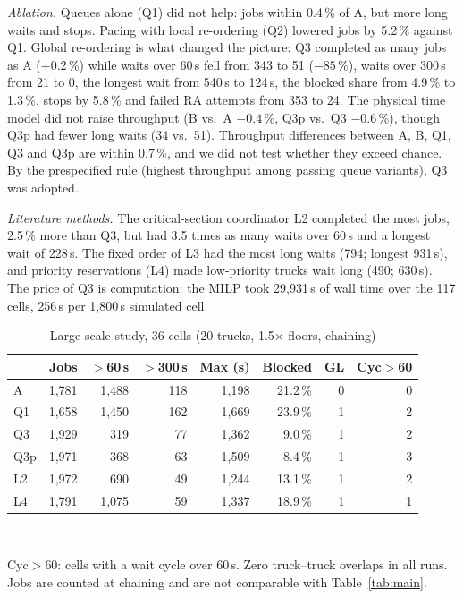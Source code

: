 \documentclass[conference]{IEEEtran}
\newcommand{\Qone}{Q1}
\newcommand{\Qtwo}{Q2}
\newcommand{\Qthree}{Q3}
\newcommand{\Qthreep}{Q3p}
\begin{document}
\emph{Ablation.} Queues alone (\Qone) did not help: jobs within 0.4\,\% of A, %
but more long waits and stops. Pacing with local re-ordering (\Qtwo) lowered jobs by
5.2\,\% against \Qone. %
Global re-ordering is what changed the picture: \Qthree{} completed as many jobs
as A (+0.2\,\%) %
while waits over 60\,s fell from 343 to 51 ($-85$\,\%), %
waits over 300\,s from 21 to 0, the longest wait from 540\,s to 124\,s, the
blocked share from 4.9\,\% to 1.3\,\%, stops by 5.8\,\% %
and failed RA attempts from 353 to 24. The physical time model did not raise
throughput (B vs.\ A $-0.4$\,\%, \Qthreep{} vs.\ \Qthree{} $-0.6$\,\%), though
\Qthreep{} had fewer long waits (34 vs.\ 51). Throughput differences between
A, B, \Qone, \Qthree{} and \Qthreep{} are within 0.7\,\%, and we did not test
whether they exceed chance. By the prespecified rule (highest throughput among
passing queue variants), \Qthree{} was adopted.

\emph{Literature methods.} The critical-section coordinator L2 completed the
most jobs, 2.5\,\% more than \Qthree, %
but had 3.5 times as many waits over 60\,s and a longest wait of 228\,s.
The fixed order of L3 had the most long waits (794; longest 931\,s), and
priority reservations (L4) made low-priority trucks wait long (490; 630\,s).
The price of \Qthree{} is computation: the MILP took 29{,}931\,s of wall time
over the 117 cells, 256\,s per 1{,}800\,s simulated cell.

\begin{table}[t]
\centering
\caption{Large-scale study, 36 cells (20 trucks, 1.5$\times$ floors, chaining)}
\label{tab:large}
\footnotesize
\setlength{\tabcolsep}{3pt}
\begin{tabular}{lrrrrrrr}
\toprule
 & Jobs & $>$60\,s & $>$300\,s & Max (s) & Blocked & GL & Cyc$>$60 \\
\midrule
A        & 1,781 & 1,488 & 118 & 1,198 & 21.2\,\% & 0 & 0 \\
\Qone    & 1,658 & 1,450 & 162 & 1,669 & 23.9\,\% & 1 & 2 \\
\Qthree  & 1,929 &   319 &  77 & 1,362 &  9.0\,\% & 1 & 2 \\
\Qthreep & 1,971 &   368 &  63 & 1,509 &  8.4\,\% & 1 & 3 \\
L2       & 1,972 &   690 &  49 & 1,244 & 13.1\,\% & 1 & 2 \\
L4       & 1,791 & 1,075 &  59 & 1,337 & 18.9\,\% & 1 & 1 \\
\bottomrule
\end{tabular}\\[2pt]
\parbox{\columnwidth}{\scriptsize Cyc$>$60: cells with a wait cycle over
60\,s. Zero truck--truck overlaps in all runs. Jobs are counted at chaining
and are not comparable with Table~\ref{tab:main}.}
\end{table}
\end{document}
